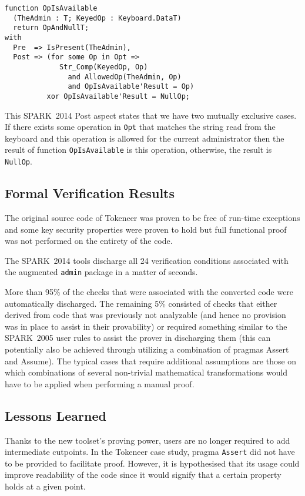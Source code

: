 \documentclass[10pt,a4paper,twocolumn]{article}
\newcommand{\oldspark}{SPARK~2005\xspace}
\newcommand{\newspark}{SPARK~2014\xspace}
\begin{document}
\begin{lstlisting}
function OpIsAvailable
  (TheAdmin : T; KeyedOp : Keyboard.DataT)
  return OpAndNullT;
with
  Pre  => IsPresent(TheAdmin),
  Post => (for some Op in Opt =>
             Str_Comp(KeyedOp, Op)
               and AllowedOp(TheAdmin, Op)
               and OpIsAvailable'Result = Op)
          xor OpIsAvailable'Result = NullOp;
\end{lstlisting}
This \newspark Post aspect states that we have two mutually exclusive
cases. If there exists some operation in \verb|Opt| that matches the
string read from the keyboard and this operation is allowed for the
current administrator then the result of function \verb|OpIsAvailable|
is this operation, otherwise, the result is \verb|NullOp|.

\subsection{Formal Verification Results}

The original source code of Tokeneer was proven to be free of run-time
exceptions and some key security properties were proven to hold but
full functional proof was not performed on the entirety of the code.

The \newspark tools discharge all 24 verification conditions
associated with the augmented \verb|admin| package in a matter of
seconds.

More than 95\% of the checks that were associated with the converted
code were automatically discharged. The remaining 5\% consisted of
checks that either derived from code that was previously not
analyzable (and hence no provision was in place to assist in their
provability) or required something similar to the \oldspark user rules
to assist the prover in discharging them (this can potentially also be
achieved through utilizing a combination of pragmas Assert and
Assume). The typical cases that require additional assumptions are
those on which combinations of several non-trivial mathematical
transformations would have to be applied when performing a manual
proof.

\subsection{Lessons Learned}

Thanks to the new toolset's proving power, users are no longer
required to add intermediate cutpoints. In the Tokeneer case study,
pragma \verb|Assert| did not have to be provided to facilitate
proof. However, it is hypothesised that its usage could improve
readability of the code since it would signify that a certain property
holds at a given point.
\end{document}
